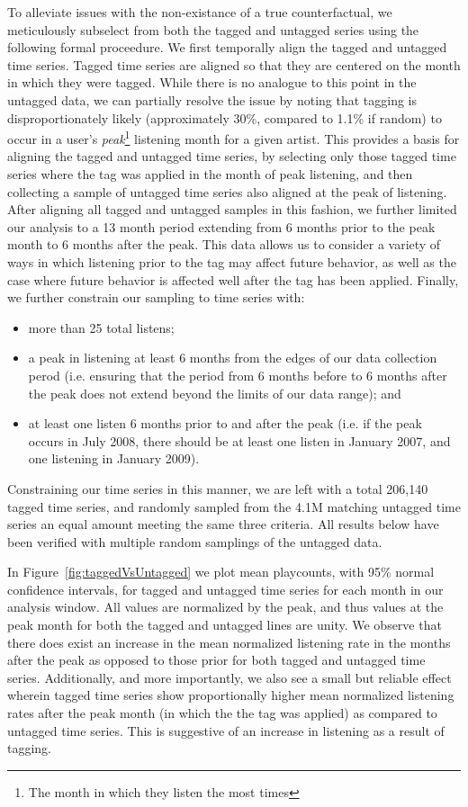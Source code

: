 To alleviate issues with the non-existance of a true counterfactual, we meticulously subselect from both the tagged and untagged series using the following formal proceedure. We first temporally align the tagged and untagged time series. Tagged time series are aligned so that they are centered on the month in which they were tagged.  While there is no analogue to this point in the untagged data, we can partially resolve the issue by noting that tagging is disproportionately likely (approximately 30\%, compared to 1.1\% if random) to occur in a user's \emph{peak}\footnote{The month in which they listen the most times} listening month for a given artist.  This provides a basis for aligning the tagged and untagged time series, by selecting only those tagged time series where the tag was applied in the month of peak listening, and then collecting a sample of untagged time series also aligned at the peak of listening. After aligning all tagged and untagged samples in this fashion, we further limited our analysis to a 13 month period extending from 6 months prior to the peak month to 6 months after the peak. This data allows us to consider a variety of ways in which listening prior to the tag may affect future behavior, as well as the case where future behavior is affected well after the tag has been applied. Finally, we further constrain our sampling to time series with:
\begin{itemize}
\item more than 25 total listens; 
\item a peak in listening at least 6 months from the edges of our data collection perod (i.e. ensuring that the period from 6 months before to 6 months after the peak does not extend beyond the limits of our data range); and
\item at least one listen 6 months prior to and after the peak (i.e. if the peak occurs in July 2008, there should be at least one listen in January 2007, and one listening in January 2009).
\end{itemize}

Constraining our time series in this manner, we are left with a total 206,140 tagged time series, and randomly sampled from the 4.1M matching untagged time series an equal amount meeting the same three criteria.  All results below have been verified with multiple random samplings of the untagged data.

In Figure~\ref{fig:taggedVsUntagged} we plot mean playcounts, with 95\% normal confidence intervals, for tagged and untagged time series for each month in our analysis window. All values are normalized by the peak, and thus values at the peak month for both the tagged and untagged lines are unity. We observe that there does exist an increase in the mean normalized listening rate in the months after the peak as opposed to those prior for both tagged and untagged time series. Additionally, and more importantly, we also see a small but reliable effect wherein tagged time series show proportionally higher mean normalized listening rates after the peak month (in which the the tag was applied) as compared to untagged time series. This is suggestive of an increase in listening as a result of tagging.

